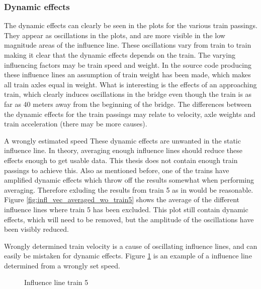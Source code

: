 


\subsubsection{Dynamic effects}
The dynamic effects can clearly be seen in the plots for the various train passings. They appear as oscillations in the plots, and are more visible in the low magnitude areas of the influence line. These oscillations vary from train to train making it clear that the dynamic effects depends on the train. The varying influencing factors may be train speed and weight. In the source code producing these influence lines an assumption of train weight has been made, which makes all train axles equal in weight.
What is interesting is the effects of an approaching train, which clearly induces oscillations in the bridge even though the train is as far as 40 meters away from the beginning of the bridge. The differences between the dynamic effects for the train passings may relate to velocity, axle weights and train acceleration (there may be more causes).

A wrongly estimated speed
These dynamic effects are unwanted in the static influence line. In theory, averaging enough influence lines should reduce these effects enough to get usable data. This thesis does not contain enough train passings to achieve this. Also as mentioned before, one of the trains have amplified dynamic effects which throw off the results somewhat when performing averaging. Therefore exluding the results from train 5 as in would be reasonable. Figure \ref{fig:infl_vec_averaged_wo_train5} shows the average of the different influence lines where train 5 has been excluded. This plot still contain dynamic effects, which will need to be removed, but the amplitude of the oscillations have been visibly reduced.

Wrongly determined train velocity is a cause of oscillating influence lines, and can easily be mistaken for dynamic effects. Figure \ref{fig:train5_wrongSpeed} is an example of a influence line determined from a wrongly set speed.
\begin{figure}[H]
	\begin{adjustbox}{center}
		
	\end{adjustbox}
	\caption{Influence line train 5}
	\label{fig:train5_wrongSpeed}
\end{figure}

